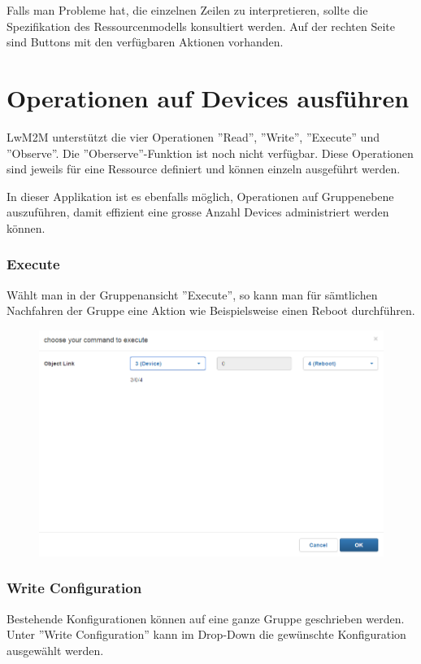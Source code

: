 Falls man Probleme hat, die einzelnen Zeilen zu interpretieren, sollte die Spezifikation des Ressourcenmodells konsultiert werden. Auf der rechten Seite sind Buttons mit den verfügbaren Aktionen vorhanden.
\newpage

\section{Operationen auf Devices ausführen}
LwM2M unterstützt die vier Operationen ''Read'', ''Write'', ''Execute'' und ''Observe''. Die ''Oberserve''-Funktion ist noch nicht verfügbar. Diese Operationen sind jeweils für eine Ressource definiert und können einzeln ausgeführt werden.

In dieser Applikation ist es ebenfalls möglich, Operationen auf Gruppenebene auszuführen, damit effizient eine grosse Anzahl Devices administriert werden können.

\subsubsection{Execute}
Wählt man in der Gruppenansicht ''Execute'', so kann man für sämtlichen Nachfahren der Gruppe eine Aktion wie Beispielsweise einen Reboot durchführen.

\begin{figure}[H]
\includegraphics[scale=0.57]{../05_Schlussbericht/images/benutzeranleitung/reboot.png}
\end{figure}

\subsubsection{Write Configuration}
Bestehende Konfigurationen können auf eine ganze Gruppe geschrieben werden. Unter ''Write Configuration'' kann im Drop-Down die gewünschte Konfiguration ausgewählt werden.
\newpage

